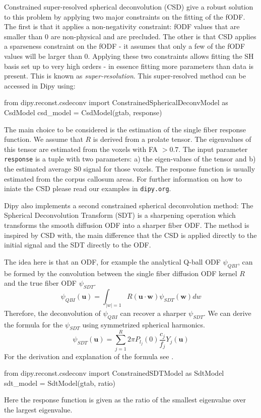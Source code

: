 \documentclass{bioinfo}
\begin{document}
Constrained super-resolved spherical deconvolution (CSD) \citep{tournier-calamante-etal:07} give a robust solution to this problem by applying two major constraints on the fitting of the fODF. The first is that it applies a non-negativity constraint: fODF values that are smaller than 0 are non-physical and are precluded. The other is that CSD applies a sparseness constraint on the fODF - it assumes that only a few of the fODF values will be larger than 0. Applying these two constraints allows fitting the SH basis set up to very high orders - in essence fitting more parameters than data is present. This is known as \emph{super-resolution}. This super-resolved method can be accessed in Dipy using:
\begin{python}
from dipy.reconst.csdeconv import
        ConstrainedSphericalDeconvModel as CsdModel
csd_model = CsdModel(gtab, response)
\end{python}
The main choice to be considered is the estimation of the single fiber response function.  We assume that $R$ is derived from a prolate tensor. The eigenvalues of this tensor are estimated from the voxels with FA $> 0.7$. The input parameter \texttt{response} is a tuple with two parameters: a) the eigen-values of the tensor and b) the estimated average S0 signal for those voxels. The response function is usually estimated from the corpus callosum areas. For further information on how to iniate the CSD please read our examples in \texttt{dipy.org}.

Dipy also implements a second constrained spherical deconvolution method: The Spherical Deconvolution Transform (SDT) is a sharpening operation which transforms the smooth diffusion ODF into a sharper fiber ODF. The method is inspired by CSD \cite{tournier-calamante-etal:07} with, the main difference that the CSD is applied directly to the initial signal and the SDT directly to the ODF.

The idea here is that an ODF, for example the analytical Q-ball ODF $\psi_{QBI}$, can be formed by the convolution between the single fiber diffusion ODF kernel $R$ and the true fiber ODF $\psi_{SDT}$.
\begin{equation}
\psi_{QBI}(\mathbf{u})=\displaystyle\int_{|w|=1} R(\mathbf{u} \cdot \mathbf{w}) \psi_{SDT}(\mathbf{w}) dw\label{eq:Conv}
\end{equation}
Therefore, the deconvolution of $\psi_{QBI}$ can recover a sharper $\psi_{SDT}$. We can derive the formula for the $\psi_{SDT}$ using symmetrized spherical harmonics.
\begin{equation}
\psi_{SDT}(\mathbf{u})=\displaystyle\sum_{j=1}^{R}2\pi P_{l_{j}}(0) \frac{c_j}{f_j}Y_{j}(\mathbf{u})\label{eq:ODF_SDT}
\end{equation}
For the derivation and explanation of the formula see \citep{descoteaux-deriche-etal:09}.
\begin{python}
from dipy.reconst.csdeconv import
        ConstrainedSDTModel as SdtModel
sdt_model = SdtModel(gtab, ratio)
\end{python}
Here the response function is given as the ratio of the smallest eigenvalue over the largest eigenvalue.
\end{document}
